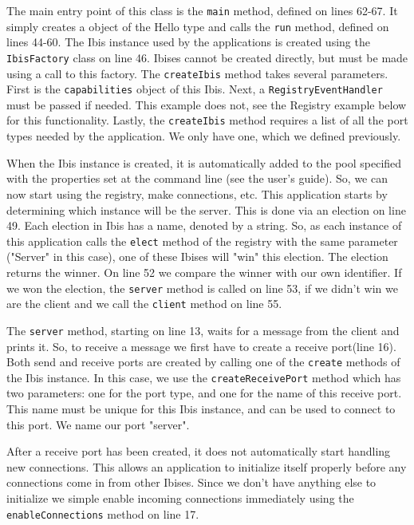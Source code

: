 The main entry point of this class is the \texttt{main} method, defined
on lines 62-67. It simply creates a object of the Hello type and calls
the \texttt{run} method, defined on lines 44-60. The Ibis instance used
by the applications is created using the \texttt{IbisFactory} class on
line 46. Ibises cannot be created directly, but must be made using a
call to this factory. The \texttt{createIbis} method takes several
parameters. First is the \texttt{capabilities} object of this Ibis.
Next, a \texttt{RegistryEventHandler} must be passed if needed. This
example does not, see the Registry example below for this functionality.
Lastly, the \texttt{createIbis} method requires a list of all the port
types needed by the application. We only have one, which we defined
previously.

When the Ibis instance is created, it is automatically added to the pool
specified with the properties set at the command line (see the
user's guide). So, we can now start using the registry, make
connections, etc. This application starts by determining which instance
will be the server. This is done via an election on line 49. Each
election in Ibis has a name, denoted by a string. So, as each instance
of this application calls the \texttt{elect} method of the registry with
the same parameter ("Server" in this case), one of these Ibises will
"win" this election. The election returns the winner. On line 52 we
compare the winner with our own identifier. If we won the election, the
\texttt{server} method is called on line 53, if we didn't win we are the
client and we call the \texttt{client} method on line 55.

The \texttt{server} method, starting on line 13, waits for a message
from the client and prints it. So, to receive a message we first have to
create a receive port(line 16). Both send and receive ports are created
by calling one of the \texttt{create} methods of the Ibis instance. In
this case, we use the \texttt{createReceivePort} method which has two
parameters: one for the port type, and one for the name of this
receive port. This name must be unique for this Ibis instance, and can
be used to connect to this port. We name our port "server".

After a receive port has been created, it does not automatically start
handling new connections. This allows an application to initialize
itself properly before any connections come in from other Ibises. Since
we don't have anything else to initialize we simple enable incoming
connections immediately using the \texttt{enableConnections} method on
line 17.

